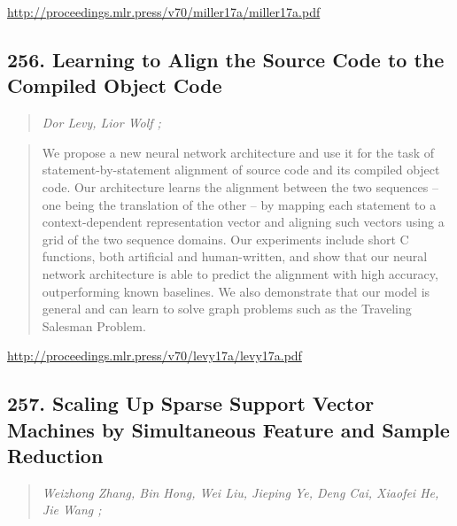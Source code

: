 \documentclass{article}
\begin{document}
\href{http://proceedings.mlr.press/v70/miller17a/miller17a.pdf}{http://proceedings.mlr.press/v70/miller17a/miller17a.pdf}

\subsection{256. Learning to Align the Source Code to the Compiled Object Code}

\begin{quote}
\footnotesize{\textit{Dor Levy, Lior Wolf ;}}

\end{quote}

\begin{quote}
    We propose a new neural network architecture and use it for the task of statement-by-statement alignment of source code and its compiled object code. Our architecture learns the alignment between the two sequences – one being the translation of the other – by mapping each statement to a context-dependent representation vector and aligning such vectors using a grid of the two sequence domains. Our experiments include short C functions, both artificial and human-written, and show that our neural network architecture is able to predict the alignment with high accuracy, outperforming known baselines. We also demonstrate that our model is general and can learn to solve graph problems such as the Traveling Salesman Problem.  
\end{quote}

\href{http://proceedings.mlr.press/v70/levy17a/levy17a.pdf}{http://proceedings.mlr.press/v70/levy17a/levy17a.pdf}

\subsection{257. Scaling Up Sparse Support Vector Machines by Simultaneous Feature and Sample Reduction}

\begin{quote}
\footnotesize{\textit{Weizhong Zhang, Bin Hong, Wei Liu, Jieping Ye, Deng Cai, Xiaofei He, Jie Wang ;}}

\end{quote}
\end{document}
